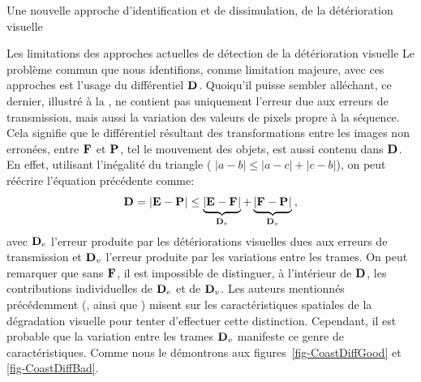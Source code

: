 \begin{chapter}{Une nouvelle approche d'identification et de dissimulation, de
la détérioration visuelle}
\begin{section}{Les limitations des approches actuelles de détection de la
détérioration visuelle}
Le problème commun que nous identifions, comme limitation majeure, avec ces
approches est l'usage du différentiel $\mathbf{D}_{}$. Quoiqu'il puisse sembler
alléchant, ce dernier, illustré à la , ne contient pas uniquement
l'erreur due aux erreurs de transmission, mais aussi la variation des valeurs de
pixels propre à la séquence. Cela signifie que le différentiel résultant des
transformations entre les images non erronées, entre $\mathbf{F}_{}$ et $\mathbf{P}_{}$, tel
le mouvement des objets, est aussi contenu dans $\mathbf{D}_{}$. En effet, utilisant
l'inégalité du triangle ( $\left|a-b\right| \le\left|a-c\right| +
\left|c-b\right| $), on peut réécrire l'équation précédente comme:
\begin{equation}
\mathbf{D}_{}= \left|\mathbf{E}_{}-\mathbf{P}_{}\right| \le   \underbrace{
\left|\mathbf{E}_{}-\mathbf{F}_{}\right|}_{\mathbf{D}_{e}} +   \underbrace{
\left|\mathbf{F}_{}-\mathbf{P}_{}\right|}_{\mathbf{D}_{v}}\:,
\end{equation}
avec $\mathbf{D}_{e}$ l'erreur produite par les détériorations visuelles dues aux
erreurs de transmission et $\mathbf{D}_{v}$ l'erreur produite par les variations entre
les trames.  On peut remarquer que sans $\mathbf{F}_{}$, il est impossible de
distinguer, à l'intérieur de $\mathbf{D}_{}$, les contributions individuelles de
$\mathbf{D}_{e}$ et de $\mathbf{D}_{v}$. Les auteurs mentionnés précédemment
(\citet{Superiori2007}, \citet{Ikuno2007} ainsi que \citet{Farrugia2008}) misent
sur les caractéristiques spatiales de la dégradation visuelle pour tenter
d'effectuer cette distinction. Cependant, il est probable que la variation entre
les trames $\mathbf{D}_{v}$ manifeste ce genre de caractéristiques. Comme nous le
démontrons aux figures~\ref{fig-CoastDiffGood} et \ref{fig-CoastDiffBad}.


\end{section}
\end{chapter}

